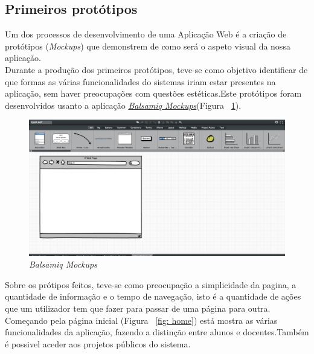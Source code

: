 \subsection{Primeiros protótipos}

Um dos processos de desenvolvimento de uma Aplicação Web é a criação de protótipos (\emph{Mockups}) que demonstrem de como será o aspeto visual da nossa aplicação.\\
Durante a produção dos primeiros protótipos, teve-se como objetivo identificar de que formas as várias funcionalidades do sistemas iriam estar presentes na aplicação, sem haver preocupações com questões estéticas.Este protótipos foram desenvolvidos usanto a aplicação \href{http://balsamiq.com/products/mockups/}{\emph{Balsamiq Mockups}}(Figura ~\ref{fig: balsamiq}).\\

\begin{figure}[htbp] 
        \centering
        \includegraphics[width=1\textwidth]{images/prototipos/mockups/balsamiq.png}
         \caption{\emph{Balsamiq Mockups}}
         \label{fig: balsamiq}
\end{figure}


Sobre os prótipos feitos, teve-se como preocupação a simplicidade da pagina, a quantidade de informação e o tempo de navegação, isto é a quantidade de ações que um utilizador tem que fazer para passar de uma página para outra.\\
Começando pela página inicial (Figura ~\ref{fig: home}) está mostra as várias funcionalidades da aplicação, fazendo a distinção entre alunos e docentes.Também é possivel aceder aos projetos públicos do sistema.\\

